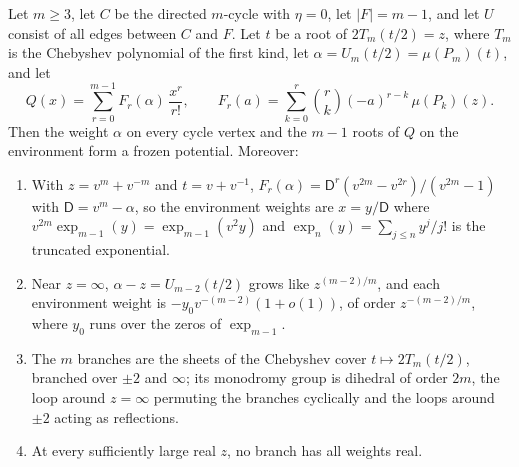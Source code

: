 \begin{theorem}\label{thm:every-cycle}
Let $m\ge3$, let $C$ be the directed $m$-cycle with $\eta=0$, let $|F|=m-1$, and let $U$ consist of all edges between $C$ and $F$. Let $t$ be a root of $2T_m(t/2)=z$, where $T_m$ is the Chebyshev polynomial of the first kind, let $\alpha=U_m(t/2)=\mu(P_m)(t)$, and let
\[
Q(x)=\sum_{r=0}^{m-1}F_r(\alpha)\,\frac{x^{r}}{r!},\qquad F_r(a)=\sum_{k=0}^{r}\binom{r}{k}(-a)^{r-k}\,\mu(P_k)(z).
\]
Then the weight $\alpha$ on every cycle vertex and the $m-1$ roots of $Q$ on the environment form a frozen potential. Moreover:
\begin{enumerate}[label=\textup{(\arabic*)}]
\item With $z=v^{m}+v^{-m}$ and $t=v+v^{-1}$, $F_r(\alpha)=\mathsf D^{r}(v^{2m}-v^{2r})/(v^{2m}-1)$ with $\mathsf D=v^{m}-\alpha$, so the environment weights are $x=y/\mathsf D$ where $v^{2m}\exp_{m-1}(y)=\exp_{m-1}(v^{2}y)$ and $\exp_n(y)=\sum_{j\le n}y^{j}/j!$ is the truncated exponential.
\item Near $z=\infty$, $\alpha-z=U_{m-2}(t/2)$ grows like $z^{(m-2)/m}$, and each environment weight is $-y_0v^{-(m-2)}(1+o(1))$, of order $z^{-(m-2)/m}$, where $y_0$ runs over the zeros of $\exp_{m-1}$.
\item The $m$ branches are the sheets of the Chebyshev cover $t\mapsto2T_m(t/2)$, branched over $\pm2$ and $\infty$; its monodromy group is dihedral of order $2m$, the loop around $z=\infty$ permuting the branches cyclically and the loops around $\pm2$ acting as reflections.
\item At every sufficiently large real $z$, no branch has all weights real.
\end{enumerate}
\end{theorem}
